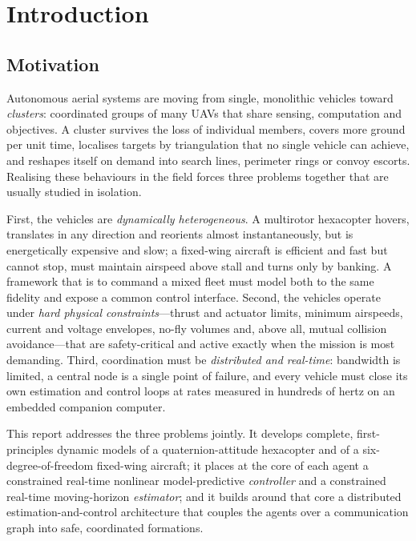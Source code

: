 \chapter{Introduction}
\label{ch:intro}

\section{Motivation}

Autonomous aerial systems are moving from single, monolithic vehicles toward
\emph{clusters}: coordinated groups of many UAVs that share sensing, computation
and objectives. A cluster survives the loss of individual members, covers more
ground per unit time, localises targets by triangulation that no single vehicle
can achieve, and reshapes itself on demand into search lines, perimeter rings or
convoy escorts. Realising these behaviours in the field forces three problems
together that are usually studied in isolation.

First, the vehicles are \emph{dynamically heterogeneous}. A multirotor
hexacopter hovers, translates in any direction and reorients almost
instantaneously, but is energetically expensive and slow; a fixed-wing aircraft
is efficient and fast but cannot stop, must maintain airspeed above stall and
turns only by banking. A framework that is to command a mixed fleet must model
both to the same fidelity and expose a common control interface. Second, the
vehicles operate under \emph{hard physical constraints}---thrust and actuator
limits, minimum airspeeds, current and voltage envelopes, no-fly volumes and,
above all, mutual collision avoidance---that are safety-critical and active
exactly when the mission is most demanding. Third, coordination must be
\emph{distributed and real-time}: bandwidth is limited, a central node is a
single point of failure, and every vehicle must close its own estimation and
control loops at rates measured in hundreds of hertz on an embedded
companion computer.

This report addresses the three problems jointly. It develops complete,
first-principles dynamic models of a quaternion-attitude hexacopter and of a
six-degree-of-freedom fixed-wing aircraft; it places at the core of each agent a
constrained real-time nonlinear model-predictive \emph{controller} and a
constrained real-time moving-horizon \emph{estimator}; and it builds around that
core a distributed estimation-and-control architecture that couples the agents
over a communication graph into safe, coordinated formations.

